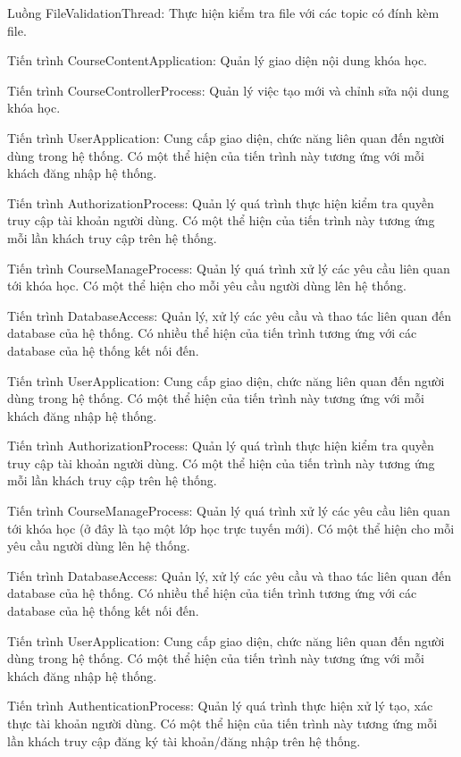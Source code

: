 \documentclass[./../main_file.tex]{subfiles}
\begin{document}
\begin{description}
\item Luồng FileValidationThread: Thực hiện kiểm tra file với các topic có đính kèm file.
\item Tiến trình CourseContentApplication: Quản lý giao diện nội dung khóa học.
\item Tiến trình CourseControllerProcess: Quản lý việc tạo mới và chỉnh sửa nội dung khóa học.
\item Tiến trình UserApplication: Cung cấp giao diện, chức năng liên quan đến người dùng trong hệ thống. Có một thể hiện của tiến trình này tương ứng với mỗi khách đăng nhập hệ thống.
\item Tiến trình AuthorizationProcess: Quản lý quá trình thực hiện kiểm tra quyền truy cập tài khoản người dùng.
Có một thể hiện của tiến trình này tương ứng mỗi lần khách truy cập trên hệ thống.
\item Tiến trình CourseManageProcess: Quản lý quá trình xử lý các yêu cầu liên quan tới khóa học.
Có một thể hiện cho mỗi yêu cầu người dùng lên hệ thống.
\item Tiến trình DatabaseAccess: Quản lý, xử lý các yêu cầu và thao tác liên quan đến database của hệ thống. Có nhiều thể hiện của tiến trình tương ứng với các database của hệ thống kết nối đến.
\item Tiến trình UserApplication: Cung cấp giao diện, chức năng liên quan đến người dùng trong hệ thống. Có một thể hiện của tiến trình này tương ứng với mỗi khách đăng nhập hệ thống.
\item Tiến trình AuthorizationProcess: Quản lý quá trình thực hiện kiểm tra quyền truy cập tài khoản người dùng.
Có một thể hiện của tiến trình này tương ứng mỗi lần khách truy cập trên hệ thống.
\item Tiến trình CourseManageProcess: Quản lý quá trình xử lý các yêu cầu liên quan tới khóa học (ở đây là tạo một lớp học trực tuyến mới).
Có một thể hiện cho mỗi yêu cầu người dùng lên hệ thống.
\item Tiến trình DatabaseAccess: Quản lý, xử lý các yêu cầu và thao tác liên quan đến  database của hệ thống. Có nhiều thể hiện của tiến trình tương ứng với các database của hệ thống kết nối đến.
\item Tiến trình UserApplication: Cung cấp giao diện, chức năng liên quan đến người dùng trong hệ thống. Có một thể hiện của tiến trình này tương ứng với mỗi khách đăng nhập hệ thống.
\item Tiến trình AuthenticationProcess: Quản lý quá trình thực hiện xử lý tạo, xác thực tài khoản người dùng.
	      Có một thể hiện của tiến trình này tương ứng mỗi lần khách truy cập đăng ký tài khoản/đăng nhập trên hệ thống.

\end{description}
\end{document}
